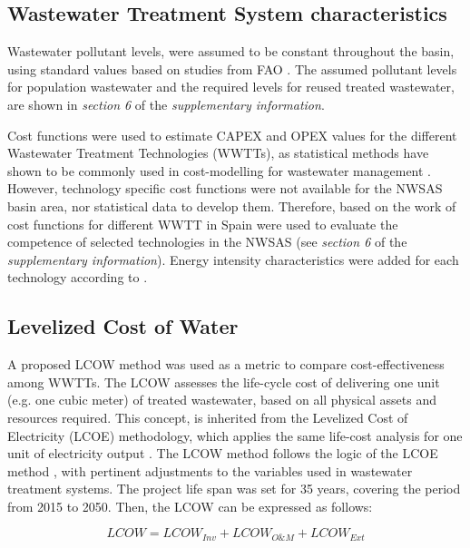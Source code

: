 \subsection{Wastewater Treatment System characteristics}
Wastewater pollutant levels, were assumed to be constant throughout the basin, using standard values based on studies from FAO \cite{fao1985water}. The assumed pollutant levels for population wastewater and the required levels for reused treated wastewater, are shown in \textit{section 6} of the \textit{supplementary information}.

Cost functions were used to estimate CAPEX and OPEX values for the different Wastewater Treatment Technologies (WWTTs), as statistical methods have shown to be commonly used in cost-modelling for wastewater management \cite{Costmodellingwastewater2011,Assessmentwastewatertreatment2012,Economicfeasibility2012}. However, technology specific cost functions were not available for the NWSAS basin area, nor statistical data to develop them. Therefore, based on the work of \citet{Assessmentwastewatertreatment2012} cost functions for different WWTT in Spain were used to evaluate the competence of selected technologies in the NWSAS (see \textit{section 6} of the \textit{supplementary information}). Energy intensity characteristics were added for each technology according to \cite{Energypatternanalysis2012,ComparativeAnalysisEnergy2017}.

\subsection{Levelized Cost of Water}
A proposed LCOW method was used as a metric to compare cost-effectiveness among WWTTs. The LCOW assesses the life-cycle cost of delivering one unit (e.g. one cubic meter) of treated wastewater, based on all physical assets and resources required. This concept, is inherited from the Levelized Cost of Electricity (LCOE) methodology, which applies the same life-cost analysis for one unit of electricity output \cite{prospectscostcompetitive2013}. The LCOW method follows the logic of the LCOE method \cite{prospectscostcompetitive2013,GeospatialLevelizedCost2015}, with pertinent adjustments to the variables used in wastewater treatment systems. The project life span was set for 35 years, covering the period from 2015 to 2050. Then, the LCOW can be expressed as follows:

\begin{equation}\label{eq:lcow}
LCOW = LCOW_{Inv} + LCOW_{O\&M} + LCOW_{Ext}
\end{equation}

